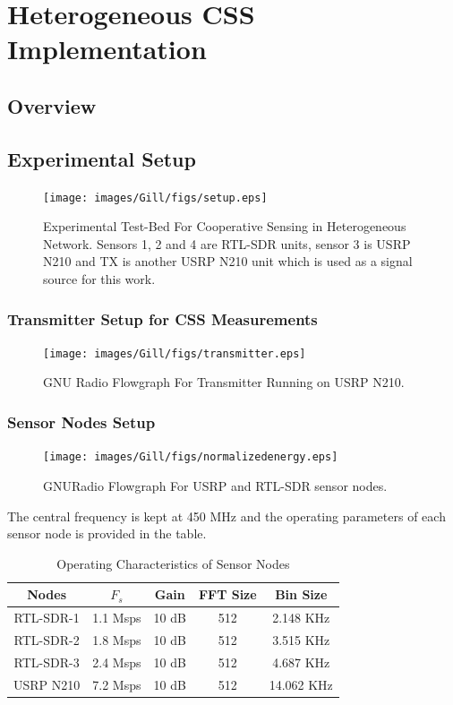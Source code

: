\chapter{Heterogeneous CSS Implementation}
\label{chapter4}


\section{Overview}

\section{Experimental Setup}

\begin{figure}[ht!]
	\centering
	\texttt{[image: images/Gill/figs/setup.eps]}
    \caption{Experimental Test-Bed For Cooperative Sensing in Heterogeneous Network. Sensors 1, 2 and 4 are RTL-SDR units, sensor 3 is USRP N210 and TX is another USRP N210 unit which is used as a signal source for this work.} 
\label{expsetup}      
\end{figure}

\subsection{Transmitter Setup for CSS Measurements}
\begin{figure}[ht!]
	\centering
	\texttt{[image: images/Gill/figs/transmitter.eps]}
    \caption{GNU Radio Flowgraph For Transmitter Running on USRP N210.} 
\label{transmitter}      
\end{figure}

\subsection{Sensor Nodes Setup}

\begin{figure}[ht!]
	\centering
	\texttt{[image: images/Gill/figs/normalizedenergy.eps]}
    \caption{GNURadio Flowgraph For USRP and RTL-SDR sensor nodes.} 
\label{receiver}      
\end{figure}

The central frequency is kept at 450 MHz and the operating parameters of each sensor node is provided in the table.
\begin{table}[!ht]
\caption{Operating Characteristics of Sensor Nodes}
\centering
\vspace{-5pt}
\begin{tabular}{|c | c | c | c | c|}
\hline
Nodes      & $F_s$     & Gain  & FFT Size &  Bin Size \\ \hline
RTL-SDR-1  & 1.1 Msps  & 10 dB & 512      & 2.148 KHz \\ \hline
RTL-SDR-2  & 1.8 Msps  & 10 dB & 512      & 3.515 KHz\\ \hline
RTL-SDR-3  & 2.4 Msps  & 10 dB & 512      & 4.687 KHz\\ \hline
USRP N210  & 7.2 Msps  & 10 dB & 512     &  14.062 KHz\\ 
\hline
\end{tabular}
\vspace{-5pt}
\label{table1}
\end{table}

